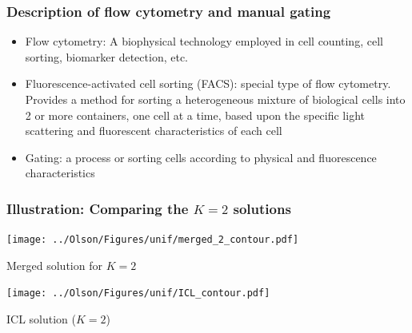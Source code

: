 \documentclass[mathserif,compress]{beamer}
\renewcommand\;{\,}
\begin{document}
\begin{frame}\frametitle{Description of flow cytometry and manual gating}
\begin{itemize}
\item
Flow cytometry:
A biophysical technology employed in cell counting, cell sorting, biomarker detection, etc.
\medskip
\item
Fluorescence-activated cell sorting (FACS): special type of flow cytometry. Provides a method for sorting a heterogeneous mixture of biological cells into 2 or more containers, one cell at a time, based upon the specific light scattering and fluorescent characteristics of each cell
\medskip
\item
Gating: a process or sorting cells according to physical and fluorescence characteristics
\end{itemize}
\end{frame}

\begin{frame}\frametitle{Illustration: Comparing the $K = 2$ solutions}
\begin{center}

\begin{minipage}{0.45\linewidth}
\texttt{[image: ../Olson/Figures/unif/merged\_2\_contour.pdf]}
\begin{center}
Merged solution for $K = 2$
\end{center}
\end{minipage}
\hfill
\begin{minipage}{0.45\linewidth}
\texttt{[image: ../Olson/Figures/unif/ICL\_contour.pdf]}
\begin{center}
ICL solution ($K = 2$)
\end{center}
\end{minipage}
\end{center}
\end{frame}
\end{document}
